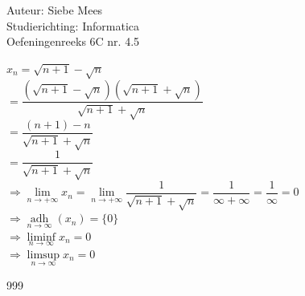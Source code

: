 \documentclass[a4paper]{article}
\begin{document}
  
\noindent \large Auteur: Siebe Mees \\
\noindent \large Studierichting: Informatica\\
\noindent \large Oefeningenreeks 6C nr. 4.5\\

\medskip

\normalsize

$x_n=\sqrt{n+1}-\sqrt{n}$\\

$=\dfrac{\left(\sqrt{n+1}-\sqrt{n}\right)\left(\sqrt{n+1}+\sqrt{n}\right)}{\sqrt{n+1}+\sqrt{n}}$\\

$=\dfrac{(n+1)-n}{\sqrt{n+1}+\sqrt{n}}$\\

$=\dfrac{1}{\sqrt{n+1}+\sqrt{n}}$\\

$\Rightarrow \lim\limits_{n \rightarrow +\infty}x_n=\lim\limits_{n \rightarrow +\infty}\dfrac{1}{\sqrt{n+1}+\sqrt{n}} = \dfrac{1}{\infty + \infty} = \dfrac{1}{\infty}= 0$\\

$\Rightarrow \operatorname*{adh}\limits_{n \rightarrow \infty}\left(x_n\right)=\{0\}$\\

$\Rightarrow \liminf\limits_{n \rightarrow \infty}x_n=0$\\

$\Rightarrow \limsup\limits_{n \rightarrow \infty}x_n=0$\\

\begin{thebibliography}{999}
\end{thebibliography}
\end{document}
